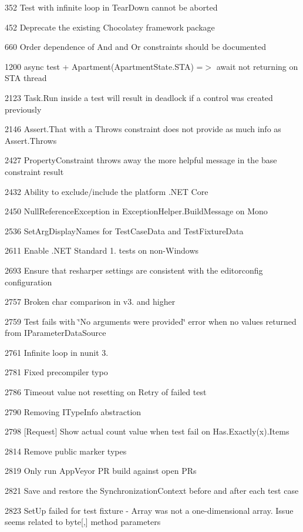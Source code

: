 \begin{DoxyItemize}
\item 352 Test with infinite loop in Tear\+Down cannot be aborted
\item 452 Deprecate the existing Chocolatey framework package
\item 660 Order dependence of And and Or constraints should be documented
\item 1200 async test + Apartment(Apartment\+State.\+S\+TA) =$>$ await not returning on S\+TA thread
\item 2123 Task.\+Run inside a test will result in deadlock if a control was created previously
\item 2146 Assert.\+That with a Throws constraint does not provide as much info as Assert.\+Throws
\item 2427 Property\+Constraint throws away the more helpful message in the base constraint result
\item 2432 Ability to exclude/include the platform .N\+ET Core
\item 2450 Null\+Reference\+Exception in Exception\+Helper.\+Build\+Message on Mono
\item 2536 Set\+Arg\+Display\+Names for Test\+Case\+Data and Test\+Fixture\+Data
\item 2611 Enable .N\+ET Standard 1. tests on non-\/\+Windows
\item 2693 Ensure that resharper settings are consistent with the editorconfig configuration
\item 2757 Broken {\ttfamily char} comparison in v3. and higher
\item 2759 Test fails with \char`\"{}\+No arguments were provided\char`\"{} error when no values returned from I\+Parameter\+Data\+Source
\item 2761 Infinite loop in nunit 3.
\item 2781 Fixed precompiler typo
\item 2786 Timeout value not resetting on Retry of failed test
\item 2790 Removing I\+Type\+Info abstraction
\item 2798 [Request] Show actual count value when test fail on Has.\+Exactly(x).Items
\item 2814 Remove public marker types
\item 2819 Only run App\+Veyor PR build against open P\+Rs
\item 2821 Save and restore the Synchronization\+Context before and after each test case
\item 2823 Set\+Up failed for test fixture -\/ Array was not a one-\/dimensional array. Issue seems related to byte[,] method parameters

\end{DoxyItemize}
